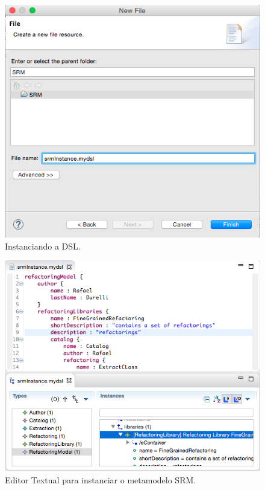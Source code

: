 \begin{figure}[!h]
	\centering
	\caption{Instanciando a DSL.}
	\label{fig:creatingSRMDSL}
	\includegraphics[scale=0.7]{images/creatingSRMDSL}
	\fautor
\end{figure}


\begin{figure}[!h]
	\centering
	\caption{Editor Textual para instanciar o metamodelo SRM.}
	\label{fig:editor_SRM_metamodel_ECORE}
	\includegraphics[scale=0.65]{images/dsl_SRM_ECORE}
	\fautor
\end{figure}


